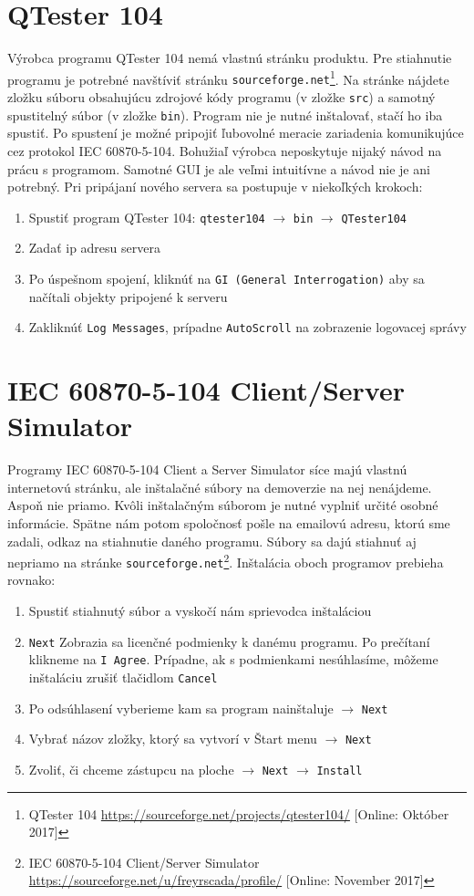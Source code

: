 \section{QTester 104}
\label{Ako_QT}
\tab Výrobca programu QTester 104 nemá vlastnú stránku produktu. Pre stiahnutie programu je potrebné navštíviť stránku {\tt sourceforge.net}\footnote{QTester 104 \url{https://sourceforge.net/projects/qtester104/} [Online: Október 2017]}. Na stránke nájdete zložku súboru obsahujúcu zdrojové kódy programu (v zložke {\tt src}) a samotný spustitelný súbor (v zložke {\tt bin}). Program nie je nutné inštalovať, stačí ho iba spustiť. Po spustení je možné pripojiť ľubovolné meracie zariadenia komunikujúce cez protokol IEC 60870-5-104. Bohužiaľ výrobca neposkytuje nijaký návod na prácu s programom. Samotné GUI je ale veľmi intuitívne a návod nie je ani potrebný. Pri pripájaní nového servera sa postupuje v niekoľkých krokoch:
\begin{enumerate}
\item Spustiť program QTester 104: {\tt qtester104} $\rightarrow$ {\tt bin} $\rightarrow$ {\tt QTester104}
\item Zadať ip adresu servera
\item Po úspešnom spojení, kliknúť na {\tt GI (General Interrogation)} aby sa načítali objekty pripojené k serveru
\item Zakliknúť {\tt Log Messages}, prípadne {\tt AutoScroll} na zobrazenie logovacej správy
\end{enumerate}

\section{IEC 60870-5-104 Client/Server Simulator}
\label{Ako_IEC}
\tab Programy IEC 60870-5-104 Client a Server Simulator síce majú vlastnú internetovú stránku, ale inštalačné súbory na demoverzie na nej nenájdeme. Aspoň nie priamo. Kvôli inštalačným súborom je nutné vyplniť určité osobné informácie. Spätne nám potom spoločnosť pošle na emailovú adresu, ktorú sme zadali, odkaz na stiahnutie daného programu. Súbory sa dajú stiahnuť aj nepriamo na stránke {\tt sourceforge.net}\footnote{IEC 60870-5-104 Client/Server Simulator \url{https://sourceforge.net/u/freyrscada/profile/} [Online: November 2017]}. Inštalácia oboch programov prebieha rovnako:
\begin{enumerate}
\item Spustiť stiahnutý súbor a vyskočí nám sprievodca inštaláciou
\item {\tt Next} Zobrazia sa licenčné podmienky k danému programu. Po prečítaní klikneme na {\tt I Agree}. Prípadne, ak s podmienkami nesúhlasíme, môžeme inštaláciu zrušiť tlačidlom {\tt Cancel}
\item Po odsúhlasení vyberieme kam sa program nainštaluje $\rightarrow$ {\tt Next}
\item Vybrať názov zložky, ktorý sa vytvorí v Štart menu $\rightarrow$ {\tt Next}
\item Zvoliť, či chceme zástupcu na ploche $\rightarrow$ {\tt Next} $\rightarrow$ {\tt Install}
\end{enumerate} \par

